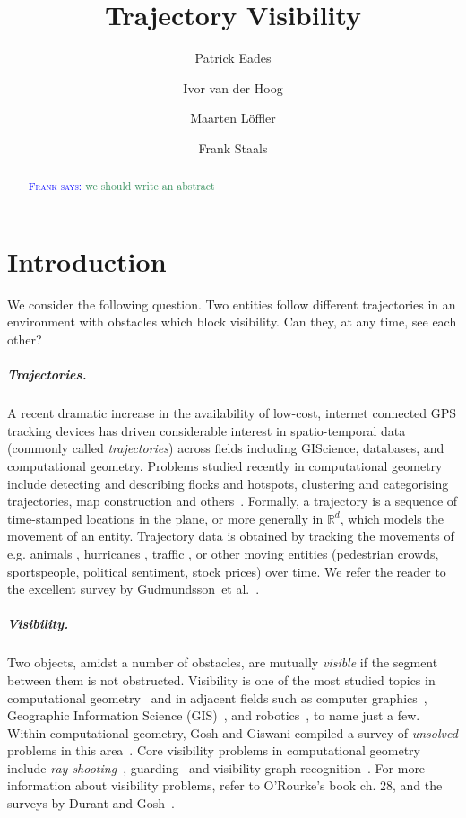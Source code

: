 \documentclass[UKenglish]{lipics-v2019}
\title{Trajectory Visibility}
\author{Patrick Eades}{University of Sydney}{patrick.eades@sydney.edu.au}{}{}
\author{Ivor van der Hoog}{Utrecht University}{i.d.vanderhoog@uu.nl}{}{}
\author{Maarten Löffler}{Utrecht University}{m.loffler@uu.nl}{}{}
\author{Frank Staals}{Utrecht University}{f.staals@uu.nl}{}{}
\newcommand{\myremark}[4]{\textcolor{blue}{\textsc{#1 #2:}} \textcolor{#4}{\textsf{#3}}}
\newcommand{\frank}[2][says]{\myremark{Frank}{#1}{#2}{SeaGreen}}
\newcommand{\etal}{\textnormal{et al.}\xspace}
\newcommand{\mkmbb}[1]{\ensuremath{\mathbb{#1}}\xspace}
\newcommand{\R}{\mkmbb{R}}
\begin{document}
\maketitle

\begin{abstract}
  \frank{we should write an abstract}
\end{abstract}





\newpage


\section {Introduction}

We consider the following question. Two entities follow different trajectories in an environment with obstacles which block visibility. Can they, at any time, see each other? 

\subparagraph {Trajectories.}

A recent dramatic increase in the availability of low-cost, internet connected GPS tracking devices has driven considerable interest in spatio-temporal data (commonly called {\em trajectories}) across fields including GIScience, databases, and computational geometry. 
Problems studied recently in computational geometry include detecting and describing flocks \cite{AnderssonGLW07, BenkertGHW08, LaubeKI04} and hotspots, clustering and categorising trajectories, map construction and others~\cite{bbgll-dcpcs-11,grsc-pcecu-07,gs-tcmrm-99,lhw-tc-07,vgk-dsmt-02}.
Formally, a trajectory is a 
sequence of time-stamped locations 
in the plane, or more generally in $\R^d$, which
models the movement of an entity.
Trajectory data is obtained by tracking the movements of e.g. animals \cite{BovetB88,Calenge200934,gal-nmibc-09}, hurricanes \cite{Stohl1998947}, traffic \cite{lltx-dftf-10}, or other moving entities \cite{dwf-rpm-09} (pedestrian crowds, sportspeople, political sentiment, stock prices) over time.
We refer the reader to the excellent survey by Gudmundsson~\etal~\cite{GudmundssonLW17}.

\subparagraph {Visibility.}
Two objects, amidst a number of obstacles, are mutually \emph{visible} if the segment between them is not obstructed. 
Visibility is one of the most studied topics in computational geometry~\cite {moet,welzl1985constructing,POCCHIOLA1996279}
and in adjacent fields such as computer graphics~\cite {Durand00amultidisciplinary}, Geographic Information Science (GIS)~\cite{FM03}, and robotics~\cite {moet}, to name just a few.
Within computational geometry, Gosh and Giswani compiled a survey of {\em unsolved} problems in this area~\cite {Ghosh:2013:UPV:2543581.2543589}.
Core visibility problems in computational geometry include {\em ray shooting}~\cite{10,13,17,20}, guarding~\cite {Chvatal75,Fisk78,survey} and visibility graph recognition~\cite{cardinal2017recognition}.
For more information about visibility problems, refer to O'Rourke's book \cite{ORourke87} ch. 28, and the surveys by Durant \cite{durand2000multidisciplinary} and Gosh~\cite{Ghosh:2013:UPV:2543581.2543589}. 
\end{document}
